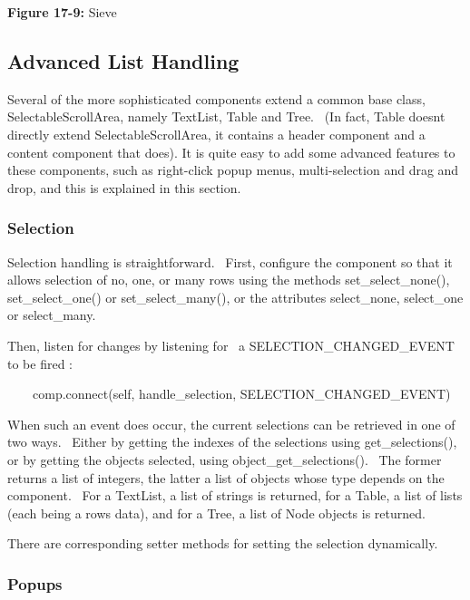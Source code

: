 {\sffamily\bfseries Figure 17-9:}
{\sffamily Sieve}

\subsection{Advanced List Handling}

Several of the more sophisticated components extend a common base class,
\textsf{SelectableScrollArea}, namely \textsf{TextList}, \textsf{Table}
and \textsf{Tree}. \ (In fact, \textsf{Table} doesn{\textquotesingle}t
directly extend \textsf{SelectableScrollArea,} it contains a header
component and a content component that does). It is quite easy to add
some advanced features to these components, such as right-click popup
menus, multi-selection and drag and drop, and this is explained in this
section.

\subsubsection{Selection}

Selection handling is straightforward. \ First, configure the component
so that it allows selection of no, one, or many rows using the methods
\textsf{set\_select\_none()}, \textsf{set\_select\_one()} or
\textsf{set\_select\_many()}, or the attributes
\textsf{{\textquotedbl}select\_none{\textquotedbl}},
\textsf{{\textquotedbl}select\_one{\textquotedbl}} or
\textsf{{\textquotedbl}select\_many{\textquotedbl}}.

Then, listen for changes by listening for \ a
\textsf{SELECTION\_CHANGED\_EVENT} to be fired :

{\sffamily
\ \ \ \ comp.connect(self,
{\textquotedbl}handle\_selection{\textquotedbl},
SELECTION\_CHANGED\_EVENT)}

When such an event does occur, the current selections can be retrieved
in one of two ways. \ Either by getting the indexes of the selections
using \textsf{get\_selections()}, or by getting the objects selected,
using \textsf{object\_get\_selections()}. \ The former returns a list
of integers, the latter a list of objects whose type depends on the
component. \ For a \textsf{TextList}, a list of strings is returned,
for a \textsf{Table}, a list of lists (each being a
row{\textquotesingle}s data), and for a \textsf{Tree}, a list of
\textsf{Node} objects is returned.

There are corresponding setter methods for setting the selection
dynamically.

\subsubsection{Popups}


